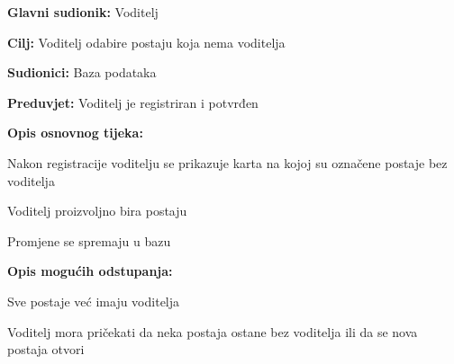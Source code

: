 					\noindent {}
					\begin{packed_item}
						
						\item \textbf{Glavni sudionik: } Voditelj
						\item  \textbf{Cilj:} Voditelj odabire postaju koja nema voditelja
						\item  \textbf{Sudionici:} Baza podataka
						\item  \textbf{Preduvjet:} Voditelj je registriran i potvrđen
						\item  \textbf{Opis osnovnog tijeka:}
						
						\item[] \begin{packed_enum}
							
							\item Nakon registracije voditelju se prikazuje karta na kojoj su označene postaje bez voditelja
							\item Voditelj proizvoljno bira postaju
							\item Promjene se spremaju u bazu
						\end{packed_enum}
						
						\item  \textbf{Opis mogućih odstupanja:}
						
						\item[] \begin{packed_item}
							
							\item[2.a] Sve postaje već imaju voditelja
							\item[] \begin{packed_enum}
								
								\item Voditelj mora pričekati da neka postaja ostane bez voditelja ili da se nova postaja otvori
								
							\end{packed_enum}
							
						\end{packed_item}
					\end{packed_item}
					
